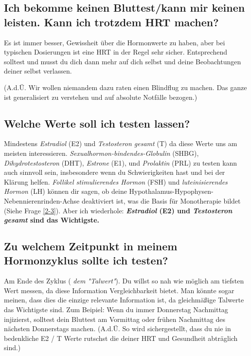 \documentclass{article}
\begin{document}
\subsection{Ich bekomme keinen Bluttest/kann mir keinen leisten. Kann ich trotzdem HRT machen?}

Es ist immer besser, Gewissheit über die Hormonwerte zu haben, aber bei typischen Dosierungen ist eine HRT in der Regel sehr sicher. Entsprechend solltest und musst du dich dann mehr auf dich selbst und deine Beobachtungen  deiner selbst verlassen.

(A.d.Ü. Wir wollen niemandem dazu raten einen Blindflug zu machen. Das ganze ist generalisiert zu verstehen und auf absolute Notfälle bezogen.)

\subsection{Welche Werte soll ich testen lassen?}

Mindestens \textit{Estradiol} (E2) und \textit{Testosteron gesamt} (T) da diese Werte uns am meisten interessieren. \textit{Sexualhormon-bindendes-Globulin} (SHBG), \textit{Dihydrotestosteron} (DHT), \textit{Estrone} (E1), und \textit{Prolaktin }(PRL) zu testen kann auch sinnvoll sein, insbesondere wenn du Schwierigkeiten hast und bei der Klärung helfen. \textit{Follikel stimulierendes Hormon} (FSH) und \textit{luteinisierendes Hormon} (LH) können dir sagen, ob deine Hypothalamus-Hypophysen-Nebennierenrinden-Achse deaktiviert ist, was die Basis für Monotherapie bildet (Siehe Frage \ref{2-3}). Aber ich wiederhole: \textbf{\textit{Estradiol} (E2) und \textit{Testosteron gesamt} sind das Wichtigste. }

\subsection{Zu welchem Zeitpunkt in meinem Hormonzyklus sollte ich testen?}

Am Ende des Zyklus (\textit{ dem "Talwert"}). Du willst so nah wie möglich am tiefsten Wert messen, da diese Information Vergleichbarkeit bietet. Man könnte sogar meinen, dass dies die einzige relevante Information ist, da gleichmäßige Talwerte das Wichtigste sind. Zum Beipiel: Wenn du immer Donnerstag Nachmittag injizierst, solltest dein Bluttest am Vormittag oder frühen Nachmittag des nächsten Donnerstags machen. (A.d.Ü. So wird sichergestellt, dass du nie in bedenkliche E2 / T Werte rutschst die deiner HRT und Gesundheit abträglich sind.)
\end{document}
